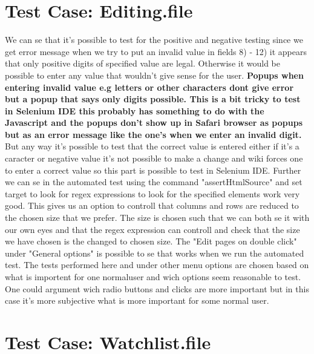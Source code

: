 \documentclass[a4paper,10pt]{article}
\begin{document}
\section{Test Case: Editing.file}

We can se that it’s possible to test for the positive and negative testing since we get error message when we
try to put an invalid value in fields 8) - 12) it appears that only positive digits of specified value are legal. Otherwise
it would be possible to enter any value that wouldn’t give sense for the user. \textbf{\color{red}Popups when entering invalid value e.g letters
or other characters dont give error but a popup that says only digits possible. This is a bit tricky to test in Selenium IDE this
probably has something to do with the Javascript and the popups don't show up in Safari browser as popups but as an error message
like the one's when we enter an invalid digit.} But any way it's possible to test that the correct value is entered either if 
it's a caracter or negative value it's not possible to make a change and wiki forces one to enter a correct value so this part
is possible to test in Selenium IDE. Further we can se in the automated test using the command "assertHtmlSource" and set target
to look for regex expressions to look for the specified elements work very good. This gives us an option to controll that 
columns and rows are reduced to the chosen size that we prefer. The size is chosen such that we can both se it with our own
eyes and that the regex expression can controll and check that the size we have chosen is the changed to chosen size.
The "Edit pages on double click" under "General options" is possible to se that works when we run the automated test.
The tests performed here and under other menu options are chosen based on what is importent for one normaluser and
wich options seem reasonable to test. One could argument wich radio buttons and clicks are more important but in this case
it's more subjective what is more important for some normal user.



\section{Test Case: Watchlist.file}
\end{document}
